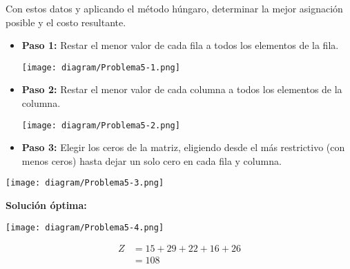 \documentclass{templateNote}
\begin{document}
Con estos datos y aplicando el m\'etodo h\'ungaro, determinar la mejor asignaci\'on posible y el costo resultante.

\begin{minipage}{0.5\textwidth}
    \begin{itemize}
        \item \textbf{Paso 1:} Restar el menor valor de cada fila a todos los elementos de la fila.
        \begin{center}
            \texttt{[image: diagram/Problema5-1.png]}
        \end{center}

        \item \textbf{Paso 2:} Restar el menor valor de cada columna a todos los elementos de la columna.
        \begin{center}
            \texttt{[image: diagram/Problema5-2.png]}
        \end{center}    
    \end{itemize}
\end{minipage}
\hfill
\begin{minipage}{0.4\textwidth}
    \begin{itemize}
        \item \textbf{Paso 3:} Elegir los ceros de la matriz, eligiendo desde el m\'as restrictivo (con menos ceros) hasta dejar un solo cero en cada fila y columna.
    \end{itemize}
    \begin{center}
        \texttt{[image: diagram/Problema5-3.png]}
    \end{center}
    \textbf{Soluci\'on \'optima:}
    \begin{center}
        \texttt{[image: diagram/Problema5-4.png]}
    \end{center}
\end{minipage}
\begin{align*}
    Z &= 15 + 29 + 22 + 16 + 26 \\
    &= 108
\end{align*}
\end{document}
